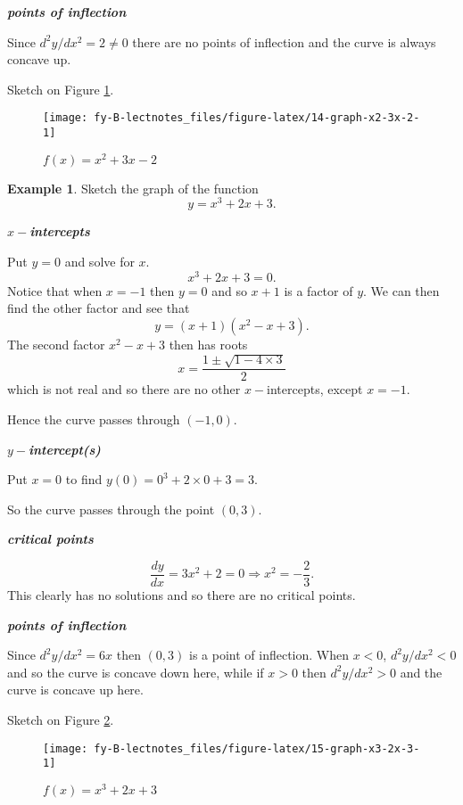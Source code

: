 \documentclass[
  11pt,
  oneside]{book}
\newcommand{\slide}{}
\theoremstyle{definition}
\theoremstyle{definition}
\newtheorem{example}{Example}[chapter]
\theoremstyle{definition}
\theoremstyle{definition}
\theoremstyle{remark}
\begin{document}
\textbf{\emph{points of inflection}}

Since \(d^2y/dx^2 = 2\ne0\) there are no points of inflection and the curve is always concave up.

Sketch on Figure \ref{fig:14-graph-x2-3x-2}.

\begin{figure}

{\centering \texttt{[image: fy-B-lectnotes\_files/figure-latex/14-graph-x2-3x-2-1]} 

}

\caption{$f(x)=x^2+3x-2$}\label{fig:14-graph-x2-3x-2}
\end{figure}
\slide

\begin{example}
Sketch the graph of the function
\[
y = x^3+2x+3.
\]
\end{example}

\textbf{\emph{\(x-\)intercepts}}

Put \(y=0\) and solve for \(x\).
\[
x^3+2x+3 = 0.
\]
Notice that when \(x=-1\) then \(y=0\) and so \(x+1\) is a factor of \(y\). We can then find the other factor and see that
\[
y = (x+1)(x^2-x+3).
\]
The second factor \(x^2-x+3\) then has roots
\[
x = \frac{1\pm\sqrt{1-4\times3}}{2}
\]
which is not real and so there are no other \(x-\)intercepts, except \(x=-1\).

Hence the curve passes through \((-1,0)\).

\slide

\textbf{\emph{\(y-\)intercept(s)}}

Put \(x=0\) to find \(y(0) = 0^3+2\times0+3 = 3\).

So the curve passes through the point \((0,3)\).

\textbf{\emph{critical points}}

\[
\frac{dy}{dx} = 3x^2+2 = 0 \Rightarrow x^2 = -\frac{2}{3}.
\]
This clearly has no solutions and so there are no critical points.

\textbf{\emph{points of inflection}}

Since \(d^2y/dx^2 = 6x\) then \((0,3)\) is a point of inflection. When \(x < 0\), \(d^2y/dx^2<0\) and so the curve is concave down here, while if \(x>0\) then \(d^2y/dx^2>0\) and the curve is concave up here.

Sketch on Figure \ref{fig:15-graph-x3-2x-3}.

\begin{figure}

{\centering \texttt{[image: fy-B-lectnotes\_files/figure-latex/15-graph-x3-2x-3-1]} 

}

\caption{$f(x)=x^3+2x+3$}\label{fig:15-graph-x3-2x-3}
\end{figure}
\slide
\end{document}

